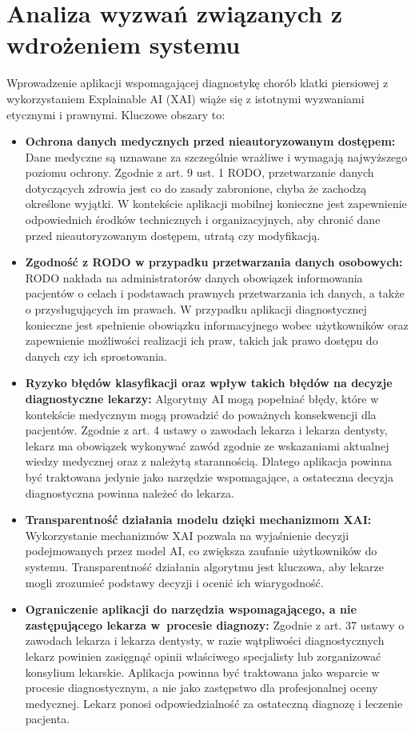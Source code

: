 \documentclass{article}
\begin{document}
\section{Analiza wyzwań związanych z wdrożeniem systemu}
Wprowadzenie aplikacji wspomagającej diagnostykę chorób klatki piersiowej z wykorzystaniem Explainable AI (XAI) wiąże się z istotnymi wyzwaniami etycznymi i prawnymi. Kluczowe obszary to:
\begin{itemize}
  \item \textbf{Ochrona danych medycznych przed nieautoryzowanym dostępem:} Dane medyczne są uznawane za szczególnie wrażliwe i wymagają najwyższego poziomu ochrony. Zgodnie z art. 9 ust. 1 RODO, przetwarzanie danych dotyczących zdrowia jest co do zasady zabronione, chyba że zachodzą określone wyjątki. W kontekście aplikacji mobilnej konieczne jest zapewnienie odpowiednich środków technicznych i organizacyjnych, aby chronić dane przed nieautoryzowanym dostępem, utratą czy modyfikacją.
  \item \textbf{Zgodność z RODO w przypadku przetwarzania danych osobowych:} RODO nakłada na administratorów danych obowiązek informowania pacjentów o celach i podstawach prawnych przetwarzania ich danych, a także o przysługujących im prawach. W przypadku aplikacji diagnostycznej konieczne jest spełnienie obowiązku informacyjnego wobec użytkowników oraz zapewnienie możliwości realizacji ich praw, takich jak prawo dostępu do danych czy ich sprostowania.
  \item \textbf{Ryzyko błędów klasyfikacji oraz wpływ takich błędów na decyzje diagnostyczne lekarzy:} Algorytmy AI mogą popełniać błędy, które w kontekście medycznym mogą prowadzić do poważnych konsekwencji dla pacjentów. Zgodnie z art. 4 ustawy o zawodach lekarza i lekarza dentysty, lekarz ma obowiązek wykonywać zawód zgodnie ze wskazaniami aktualnej wiedzy medycznej oraz z należytą starannością. Dlatego aplikacja powinna być traktowana jedynie jako narzędzie wspomagające, a ostateczna decyzja diagnostyczna powinna należeć do lekarza.
  \item \textbf{Transparentność działania modelu dzięki mechanizmom XAI:} Wykorzystanie mechanizmów XAI pozwala na wyjaśnienie decyzji podejmowanych przez model AI, co zwiększa zaufanie użytkowników do systemu. Transparentność działania algorytmu jest kluczowa, aby lekarze mogli zrozumieć podstawy decyzji i ocenić ich wiarygodność.
  \item \textbf{Ograniczenie aplikacji do narzędzia wspomagającego, a nie zastępującego lekarza w~procesie diagnozy:} Zgodnie z art. 37 ustawy o zawodach lekarza i lekarza dentysty, w razie wątpliwości diagnostycznych lekarz powinien zasięgnąć opinii właściwego specjalisty lub zorganizować konsylium lekarskie. Aplikacja powinna być traktowana jako wsparcie w procesie diagnostycznym, a nie jako zastępstwo dla profesjonalnej oceny medycznej. Lekarz ponosi odpowiedzialność za ostateczną diagnozę i leczenie pacjenta.
\end{itemize}
\end{document}
